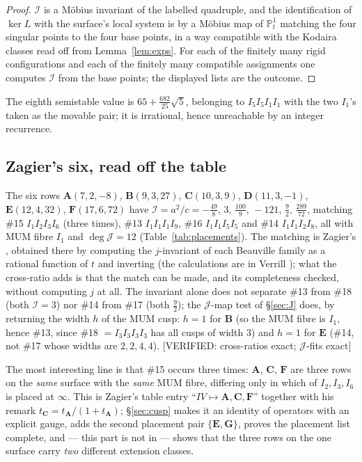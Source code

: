 \documentclass[11pt,reqno]{amsart}
\theoremstyle{plain}
\theoremstyle{definition}
\theoremstyle{remark}
\theoremstyle{plain}
\newcommand{\PP}{\mathbb{P}}
\newcommand{\VerifiedR}[1]{\textup{\textsf{[VERIFIED: #1]}}}
\begin{document}
\begin{proof}
$\mathcal I$ is a M\"obius invariant of the labelled quadruple, and the
identification of $\ker L$ with the surface's local system is by a M\"obius map
of $\PP^1_t$ matching the four singular points to the four base points, in a way
compatible with the Kodaira classes read off from Lemma~\ref{lem:exps}. For each
of the finitely many rigid configurations and each of the finitely many
compatible assignments one computes $\mathcal I$ from the base points; the
displayed lists are the outcome.
\end{proof}

The eighth semistable value is $65+\tfrac{682}{25}\sqrt5$, belonging to
$I_5I_5I_1I_1$ with the two $I_1$'s taken as the movable pair; it is irrational,
hence unreachable by an integer recurrence.

\subsection{Zagier's six, read off the table}

The six rows $\mathbf A(7,2,-8)$, $\mathbf B(9,3,27)$, $\mathbf C(10,3,9)$,
$\mathbf D(11,3,-1)$, $\mathbf E(12,4,32)$, $\mathbf F(17,6,72)$ have
$\mathcal I=a^2/c=-\tfrac{49}8,\,3,\,\tfrac{100}9,\,-121,\,\tfrac92,\,
\tfrac{289}{72}$, matching \#15 $I_1I_2I_3I_6$ (three times), \#13
$I_1I_1I_1I_9$, \#16 $I_1I_1I_5I_5$ and \#14 $I_1I_1I_2I_8$, all with MUM fibre
$I_1$ and $\deg\mathcal J=12$ (Table~\ref{tab:placements}). The matching is
Zagier's \cite[\S7]{Zagier2009}, obtained there by computing the $j$-invariant of
each Beauville family as a rational function of $t$ and inverting (the
calculations are in Verrill \cite{Verrill}); what the cross-ratio adds is that
the match can be made, and its completeness checked, without computing $j$ at
all. The invariant alone does not separate \#13 from \#18 (both $\mathcal I=3$)
nor \#14 from \#17 (both $\tfrac92$); the $\mathcal J$-map test of \S\ref{sec:J}
does, by returning the width $h$ of the MUM cusp: $h=1$ for $\mathbf B$ (so the
MUM fibre is $I_1$, hence \#13, since \#18 $=I_3I_3I_3I_3$ has all cusps of width
$3$) and $h=1$ for $\mathbf E$ (\#14, not \#17 whose widths are $2,2,4,4$).
\VerifiedR{cross-ratios exact; $\mathcal J$-fits exact}

The most interesting line is that \#15 occurs three times: $\mathbf A$,
$\mathbf C$, $\mathbf F$ are three rows on the \emph{same} surface with the
\emph{same} MUM fibre, differing only in which of $I_2,I_3,I_6$ is placed at
$\infty$. This is Zagier's table entry ``$IV\mapsto\mathbf A,\mathbf C,\mathbf
F$'' together with his remark
$t_{\mathbf C}=t_{\mathbf A}/(1+t_{\mathbf A})$; \S\ref{sec:cusp} makes it an
identity of operators with an explicit gauge, adds the second placement pair
$\{\mathbf E,\mathbf G\}$, proves the placement list complete, and --- this part
is not in \cite{Zagier2009} --- shows that the three rows on the one surface carry
\emph{two} different extension classes.
\end{document}
